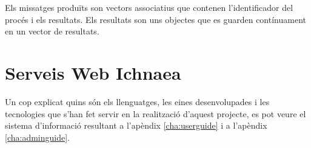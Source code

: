 Els missatges produïts son vectors associatius que contenen l'identificador del proc\'{e}s i els resultats. Els resultats son uns objectes que es guarden contínuament en un vector de resultats.\\


\section{Serveis Web Ichnaea}
Un cop explicat quins són els llenguatges, les eines desenvolupades i les tecnologies que s’han fet servir en la realització d’aquest projecte, es pot veure el sistema d’informació resultant a l'ap\`{e}ndix \ref{cha:userguide}
i a l'ap\`{e}ndix \ref{cha:adminguide}.\\ 
 